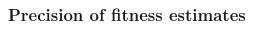 \begin{multicols}{2}





\newpage

\subsubsection{Precision of fitness estimates}
\label{sec:cross_plate_validation}

\end{multicols}
